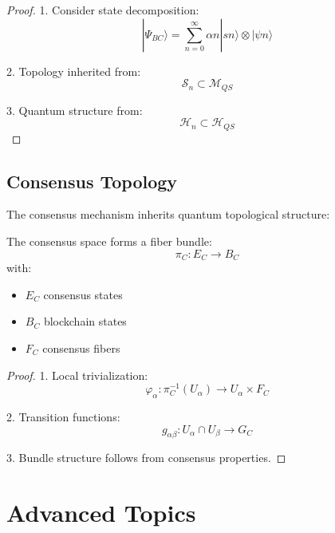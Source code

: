 \documentclass[12pt]{article}
\begin{document}
\begin{proof}
1. Consider state decomposition:
\begin{equation}
|Ψ_{BC}⟩ = \sum_{n=0}^{\infty} αn|sn⟩ \otimes |ψn⟩
\end{equation}

2. Topology inherited from:
\begin{equation}
\mathcal{S}_n \subset \mathcal{M}_{QS}
\end{equation}

3. Quantum structure from:
\begin{equation}
\mathcal{H}_n \subset \mathcal{H}_{QS}
\end{equation}
\end{proof}

\subsection{Consensus Topology}

The consensus mechanism inherits quantum topological structure:

\begin{theorem}
The consensus space forms a fiber bundle:
\begin{equation}
\pi_C: E_C \rightarrow B_C
\end{equation}
with:
\begin{itemize}
\item $E_C$ consensus states
\item $B_C$ blockchain states
\item $F_C$ consensus fibers
\end{itemize}
\end{theorem}

\begin{proof}
1. Local trivialization:
\begin{equation}
φ_α: π_C^{-1}(U_α) \rightarrow U_α \times F_C
\end{equation}

2. Transition functions:
\begin{equation}
g_{αβ}: U_α \cap U_β \rightarrow G_C
\end{equation}

3. Bundle structure follows from consensus properties.
\end{proof}

\section{Advanced Topics}
\end{document}

